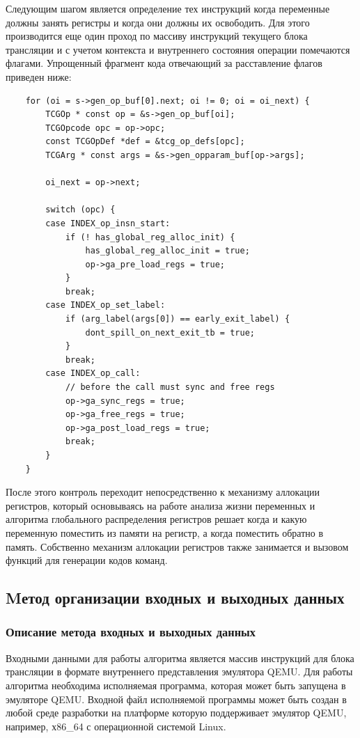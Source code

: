 Следующим шагом  является определение тех инструкций когда переменные должны занять регистры и когда они должны их освободить. Для этого производится еще один проход по массиву инструкций текущего блока трансляции и с учетом контекста и внутреннего состояния операции помечаются флагами. Упрощенный фрагмент кода отвечающий за расставление флагов приведен ниже:

\begin{small}
\begin{verbatim}
    for (oi = s->gen_op_buf[0].next; oi != 0; oi = oi_next) {
        TCGOp * const op = &s->gen_op_buf[oi];
        TCGOpcode opc = op->opc;
        const TCGOpDef *def = &tcg_op_defs[opc];
        TCGArg * const args = &s->gen_opparam_buf[op->args];

        oi_next = op->next;

        switch (opc) {
        case INDEX_op_insn_start:
            if (! has_global_reg_alloc_init) {
                has_global_reg_alloc_init = true;
                op->ga_pre_load_regs = true;
            }
            break;
        case INDEX_op_set_label:
            if (arg_label(args[0]) == early_exit_label) {
                dont_spill_on_next_exit_tb = true;
            }
            break;
        case INDEX_op_call:
            // before the call must sync and free regs
            op->ga_sync_regs = true;
            op->ga_free_regs = true;
            op->ga_post_load_regs = true;
            break;
        }
    }
\end{verbatim}
\end{small}

После этого контроль переходит непосредственно к механизму аллокации регистров, который основываясь на работе анализа жизни переменных и алгоритма глобального распределения регистров решает когда и какую переменную поместить из памяти на регистр, а когда поместить обратно в память. Собственно механизм аллокации регистров также занимается и  вызовом функций для генерации кодов команд.


\subsection{Mетод организации входных и выходных данных}

\subsubsection{Описание метода входных и выходных данных}
Входными данными для работы алгоритма является массив инструкций для блока трансляции в формате внутреннего представления эмулятора QEMU. Для работы алгоритма необходима исполняемая программа, которая может быть запущена в эмуляторе QEMU. Входной файл исполняемой программы может быть создан в любой среде разработки на платформе которую поддерживает эмулятор QEMU, например, х86\_64 с операционной системой Linux.

